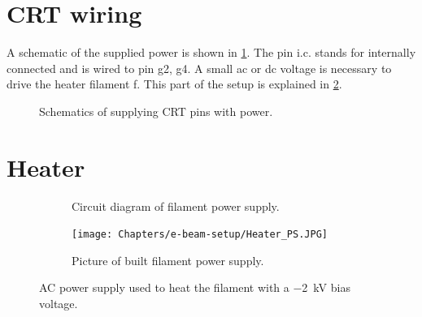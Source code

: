 \section{CRT wiring}\label{sec:CRT wiring}
A schematic of the supplied power is shown in \cref{fig:schematics of wiring}. The pin i.c. stands for internally connected and is wired to pin g2, g4. A small ac or dc voltage is necessary to drive the heater filament f. This part of the setup is explained in \cref{sec:Heater}.


\begin{figure}[H]
	\centering
	
	\begin{circuitikz}[european]
		
	\end{circuitikz}

	\caption{Schematics of supplying CRT pins with power.}
	\label{fig:schematics of wiring}
\end{figure}


\section{Heater}
\label{sec:Heater}

\begin{figure}[ht]
	\centering
	
	\begin{subfigure}[b]{0.9\textwidth}
		\begin{circuitikz}%
			
		\end{circuitikz}
		\caption{Circuit diagram of filament power supply.}
	\end{subfigure}
	
	\vspace{1cm}

	\begin{subfigure}[b]{0.9\textwidth}
		\texttt{[image: Chapters/e-beam-setup/Heater\_PS.JPG]}
		\caption{Picture of built filament power supply.}
	\end{subfigure}
	
	\caption{AC power supply used to heat the filament with a \SI{-2}{\kilo\volt} bias voltage.}
	\label{fig:heater_circuit}
\end{figure}

